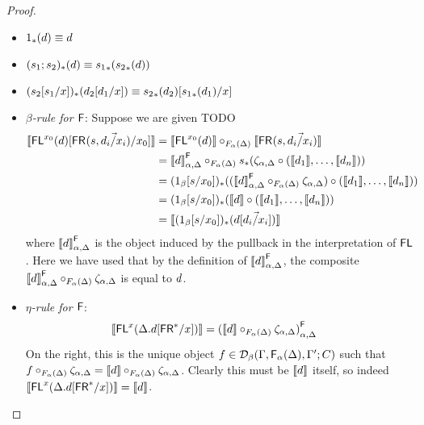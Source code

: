 \begin{proof}
\begin{itemize}
\item $1_*(d) \equiv d$
\item $(s_1;s_2)_*(d) \equiv {s_1}_*({s_2}_*(d))$
\item $(s_2[s_1/x])_*(d_2[d_1/x]) \equiv {s_2}_*(d_2)[{s_1}_*(d_1)/x]$

\item \emph{$\beta$-rule for $\mathsf{F}$}: Suppose we are given TODO
\begin{align*}
\llbracket \mathsf{FL}^{x_0}(d)[\mathsf{FR}_{}(s,\vec{d_i/x_i})/x_0] \rrbracket &= \llbracket \mathsf{FL}^{x_0}(d)\rrbracket \circ_{F_\alpha(\Delta)} \llbracket \mathsf{FR}_{}(s,\vec{d_i/x_i})\rrbracket \\
&={\llbracket d \rrbracket}^{\mathsf{F}}_{{\alpha},{\Delta}} \circ_{F_\alpha(\Delta)} s_*(\zeta_{\alpha, \Delta} \circ (\llbracket d_1 \rrbracket, \dots, \llbracket d_n \rrbracket)) \\
&= (1_\beta[s/x_0])_*(({\llbracket d \rrbracket}^{\mathsf{F}}_{{\alpha},{\Delta}} \circ_{F_\alpha(\Delta)} \zeta_{\alpha, \Delta}) \circ (\llbracket d_1 \rrbracket, \dots, \llbracket d_n \rrbracket)) \\
&= (1_\beta[s/x_0])_*(\llbracket d \rrbracket \circ (\llbracket d_1 \rrbracket, \dots, \llbracket d_n \rrbracket)) \\
&= \llbracket (1_\beta[s/x_0])_*(d[\vec{d_i/x_i}]) \rrbracket
\end{align*}
where ${\llbracket d \rrbracket}^{\mathsf{F}}_{{\alpha},{\Delta}}$ is the object induced by the pullback in the interpretation of $\mathsf{FL}$. Here we have used that by the definition of ${\llbracket d \rrbracket}^{\mathsf{F}}_{{\alpha},{\Delta}}$, the composite ${\llbracket d \rrbracket}^{\mathsf{F}}_{{\alpha},{\Delta}} \circ_{F_\alpha(\Delta)} \zeta_{\alpha, \Delta}$ is equal to $d$.

\item \emph{$\eta$-rule for $\mathsf{F}$}:
\begin{align*}
\llbracket \mathsf{FL}^{x}(\Delta.d[\mathsf{FR}^*/x]) \rrbracket &= {(\llbracket d \rrbracket \circ_{F_\alpha(\Delta)} \zeta_{\alpha, \Delta})}^{\mathsf{F}}_{{\alpha},{\Delta}}
\end{align*} 
On the right, this is the unique object $f \in \mathcal{D}_\beta(\Gamma,\mathsf{F}_{\alpha}(\Delta),\Gamma';C)$ such that $f \circ_{F_\alpha(\Delta)} \zeta_{\alpha, \Delta} = \llbracket d \rrbracket \circ_{F_\alpha(\Delta)} \zeta_{\alpha, \Delta}$. Clearly this must be $\llbracket d \rrbracket$ itself, so indeed $\llbracket \mathsf{FL}^{x}(\Delta.d[\mathsf{FR}^*/x]) \rrbracket = \llbracket d \rrbracket$.


\end{itemize}
\end{proof}
